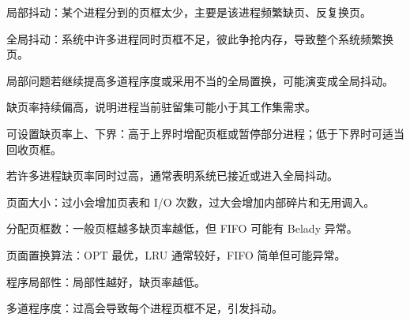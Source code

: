 \begin{points}
  \item 局部抖动：某个进程分到的页框太少，主要是该进程频繁缺页、反复换页。
  \item 全局抖动：系统中许多进程同时页框不足，彼此争抢内存，导致整个系统频繁换页。
  \item 局部问题若继续提高多道程序度或采用不当的全局置换，可能演变成全局抖动。
\end{points}


\begin{points}
  \item 缺页率持续偏高，说明进程当前驻留集可能小于其工作集需求。
  \item 可设置缺页率上、下界：高于上界时增配页框或暂停部分进程；低于下界时可适当回收页框。
  \item 若许多进程缺页率同时过高，通常表明系统已接近或进入全局抖动。
\end{points}


\begin{points}
  \item 页面大小：过小会增加页表和 I/O 次数，过大会增加内部碎片和无用调入。
  \item 分配页框数：一般页框越多缺页率越低，但 FIFO 可能有 Belady 异常。
  \item 页面置换算法：OPT 最优，LRU 通常较好，FIFO 简单但可能异常。
  \item 程序局部性：局部性越好，缺页率越低。
  \item 多道程序度：过高会导致每个进程页框不足，引发抖动。
\end{points}
